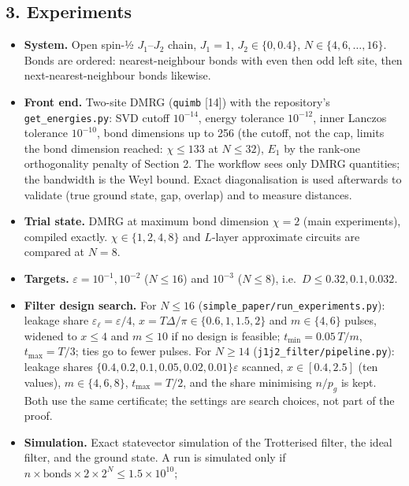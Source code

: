 \documentclass[
]{article}
\providecommand{\tightlist}{%
  \setlength{\itemsep}{0pt}\setlength{\parskip}{0pt}}
\begin{document}
\hypertarget{experiments}{%
\subsection{3. Experiments}\label{experiments}}

\begin{itemize}
\tightlist
\item
  \textbf{System.} Open spin-½ \(J_1\)--\(J_2\) chain, \(J_1=1\),
  \(J_2\in\{0,0.4\}\), \(N\in\{4,6,\dots,16\}\). Bonds are ordered:
  nearest-neighbour bonds with even then odd left site, then
  next-nearest-neighbour bonds likewise.
\item
  \textbf{Front end.} Two-site DMRG (\texttt{quimb} {[}14{]}) with the
  repository's \texttt{get\_energies.py}: SVD cutoff \(10^{-14}\),
  energy tolerance \(10^{-12}\), inner Lanczos tolerance \(10^{-10}\),
  bond dimensions up to 256 (the cutoff, not the cap, limits the bond
  dimension reached: \(\chi\le133\) at \(N\le32\)), \(E_1\) by the
  rank-one orthogonality penalty of Section 2. The workflow sees only
  DMRG quantities; the bandwidth is the Weyl bound. Exact
  diagonalisation is used afterwards to validate (true ground state,
  gap, overlap) and to measure distances.
\item
  \textbf{Trial state.} DMRG at maximum bond dimension \(\chi=2\) (main
  experiments), compiled exactly. \(\chi\in\{1,2,4,8\}\) and \(L\)-layer
  approximate circuits are compared at \(N=8\).
\item
  \textbf{Targets.} \(\varepsilon=10^{-1},10^{-2}\) (\(N\le16\)) and
  \(10^{-3}\) (\(N\le8\)), i.e.~\(D\le0.32,0.1,0.032\).
\item
  \textbf{Filter design search.} For \(N\le16\)
  (\texttt{simple\_paper/run\_experiments.py}): leakage share
  \(\varepsilon_\ell=\varepsilon/4\),
  \(x=T\Delta/\pi\in\{0.6,1,1.5,2\}\) and \(m\in\{4,6\}\) pulses,
  widened to \(x\le4\) and \(m\le10\) if no design is feasible;
  \(t_{\min}=0.05\,T/m\), \(t_{\max}=T/3\); ties go to fewer pulses. For
  \(N\ge14\) (\texttt{j1j2\_filter/pipeline.py}): leakage shares
  \(\{0.4,0.2,0.1,0.05,0.02,0.01\}\varepsilon\) scanned,
  \(x\in[0.4,2.5]\) (ten values), \(m\in\{4,6,8\}\), \(t_{\max}=T/2\),
  and the share minimising \(n/p_g\) is kept. Both use the same
  certificate; the settings are search choices, not part of the proof.
\item
  \textbf{Simulation.} Exact statevector simulation of the Trotterised
  filter, the ideal filter, and the ground state. A run is simulated
  only if \(n\times\text{bonds}\times2\times2^N\le1.5\times10^{10}\);

\end{itemize}
\end{document}
